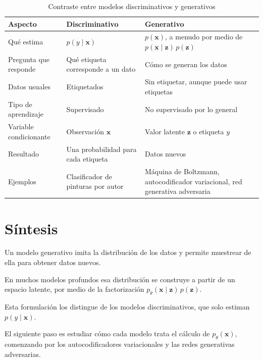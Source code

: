 \documentclass[11pt,letterpaper]{article}
\theoremstyle{definition}
\newcommand{\bx}{\mathbf{x}}
\newcommand{\bz}{\mathbf{z}}
\newcommand{\ptheta}{p_{\theta}}
\begin{document}
\begin{table}[ht]
  \centering
  \setlength{\belowcaptionskip}{6pt}
  \caption{Contraste entre modelos discriminativos y generativos}
  \label{tab:contraste}
  \renewcommand{\arraystretch}{1.25}
  \begin{tabular}{>{\raggedright\arraybackslash}p{3.4cm} >{\raggedright\arraybackslash}p{5.6cm} >{\raggedright\arraybackslash}p{5.6cm}}
    \toprule
    Aspecto & Discriminativo & Generativo \\
    \midrule
    Qué estima & $p(y \mid \bx)$ & $p(\bx)$, a menudo por medio de $p(\bx \mid \bz)\, p(\bz)$ \\
    Pregunta que responde & Qué etiqueta corresponde a un dato & Cómo se generan los datos \\
    Datos usuales & Etiquetados & Sin etiquetar, aunque puede usar etiquetas \\
    Tipo de aprendizaje & Supervisado & No supervisado por lo general \\
    Variable condicionante & Observación $\bx$ & Valor latente $\bz$ o etiqueta $y$ \\
    Resultado & Una probabilidad para cada etiqueta & Datos nuevos \\
    Ejemplos & Clasificador de pinturas por autor & Máquina de Boltzmann, autocodificador variacional, red generativa adversaria \\
    \bottomrule
  \end{tabular}
\end{table}

\section{Síntesis}

Un modelo generativo imita la distribución de los datos y permite muestrear de ella para obtener datos nuevos.

En muchos modelos profundos esa distribución se construye a partir de un espacio latente, por medio de la factorización $\ptheta(\bx \mid \bz)\, p(\bz)$.

Esta formulación los distingue de los modelos discriminativos, que solo estiman $p(y \mid \bx)$.

El siguiente paso es estudiar cómo cada modelo trata el cálculo de $\ptheta(\bx)$, comenzando por los autocodificadores variacionales y las redes generativas adversarias.

\end{document}
